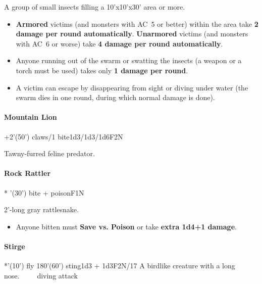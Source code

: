 \documentclass[english,11pt,openany,letterpaper,twocolumn]{book}
\begin{document}
A group of small insects filling a 10'x10'x30' area or more.
\begin{itemize}[leftmargin=*,label=\itshape\textbullet]
\item
\textbf{Armored} victims (and monsters with AC~5 or better) within the area take \textbf{2 damage per round automatically}. \textbf{Unarmored} victims (and monsters with AC~6 or worse) take \textbf{4 damage per round automatically}.
\item
Anyone running out of the swarm or swatting the insects (a weapon or a torch must be used) takes only \textbf{1 damage per round}.
\item
A victim can escape by disappearing from sight or diving under water (the swarm dies in one round, during which normal damage is done).
\end{itemize}


\setAnimalTabPositions{}

\skipline\skipline
\hypertarget{lion}{}
\paragraph{Mountain Lion}
+2'(50') claws/1 bite\tab 1d3/1d3/1d6\tab F2\tab N

Tawny-furred feline predator.


\skipline\skipline
\hypertarget{rattler}{}
\paragraph{Rock Rattler}
* '(30') bite + poison\tab F1\tab N

2'-long gray rattlesnake.
\begin{itemize}[leftmargin=*,label=\itshape\textbullet]
\item
Anyone bitten must \textbf{Save vs. Poison} or take \textbf{extra 1d4+1 damage}.
\end{itemize}

%

\skipline\skipline
\hypertarget{stirge}{}
\paragraph{Stirge}
*'(10') fly 180'(60') sting\tab 1d3 + 1d3\tab F2\tab N/17
A birdlike creature with a long nose.\tab~~~~~\hfill diving attack\op{|}{\^{}}~
\end{document}
